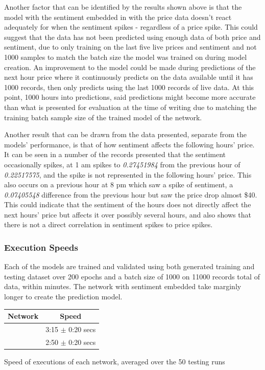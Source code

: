 \documentclass[oneside, 12pt]{article}
\begin{document}
	Another factor that can be identified by the results shown above is that the model with the sentiment embedded in with the price data doesn't react adequately for when the sentiment spikes - regardless of a price spike. This could suggest that the data has not been predicted using enough data of both price and sentiment, due to only training on the last five live prices and sentiment and not 1000 samples to match the batch size the model was trained on during model creation. An improvement to the model could be made during predictions of the next hour price where it continuously predicts on the data available until it has 1000 records, then only predicts using the last 1000 records of live data. At this point, 1000 hours into predictions, said predictions might become more accurate than what is presented for evaluation at the time of writing due to matching the training batch sample size of the trained model of the network.
	
	Another result that can be drawn from the data presented, separate from the models' performance, is that of how sentiment affects the following hours' price. It can be seen in a number of the records presented that the sentiment occasionally spikes, at 1 am spikes to \textit{0.27451984} from the previous hour of \textit{0.22517575}, and the spike is not represented in the following hours' price. This also occurs on a previous hour at 8 pm which saw a spike of sentiment, a \textit{0.07405548} difference from the previous hour but saw the price drop almost \$40. This could indicate that the sentiment of the hours does not directly affect the next hours' price but affects it over possibly several hours, and also shows that there is not a direct correlation in sentiment spikes to price spikes.
	
	\subsubsection{Execution Speeds}
	Each of the models are trained and validated using both generated training and testing dataset over 200 epochs and a batch size of 1000 on 11000 records total of data, within minutes. The network with sentiment embedded take marginly longer to create the prediction model.
	
	\begin{center}
		\begin{tabular}{c|c}
			\textbf{Network} & \textbf{Speed} \\
			\hline
			\multirow{1}{*}{} With Sentiment & 3:15 $\pm$ 0:20 secs\\
			\multirow{1}{*}{} Without Sentiment & 2:50 $\pm$ 0:20 secs\\
			
		\end{tabular}
		\newline
		
		Speed of executions of each network, averaged over the 50 testing runs
	\end{center}
	
\end{document}
